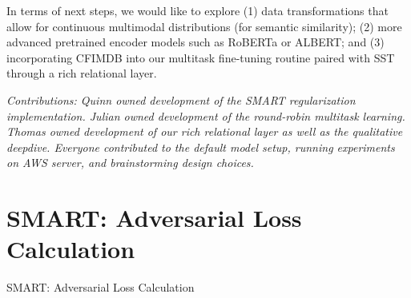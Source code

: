 \documentclass{article}
\begin{document}
In terms of next steps, we would like to explore (1) data transformations that allow for continuous multimodal distributions (for semantic similarity); (2) more advanced pretrained encoder models such as RoBERTa or ALBERT; and (3) incorporating CFIMDB into our multitask fine-tuning routine paired with SST through a rich relational layer.


\newpage
\textit{Contributions: Quinn owned development of the SMART regularization implementation. Julian owned development of the round-robin multitask learning. Thomas owned development of our rich relational layer as well as the qualitative deepdive. Everyone contributed to the default model setup, running experiments on AWS server, and brainstorming design choices.}




\newpage
\appendix
\section{SMART: Adversarial Loss Calculation}
\begin{algorithm}[h]
\caption{SMART: Adversarial Loss Calculation}
\label{alg: smart-adv}
\end{algorithm}
\end{document}
